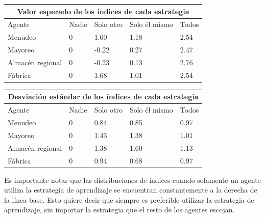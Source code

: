 \hspace{5pt}

\begin{tabular}{ |p{3cm}||p{1.7cm}|p{1.9cm}|p{2.3cm}|p{1.7cm}|  }
 \hline
 \multicolumn{5}{c}{Valor esperado de los \'indices de cada estrategia} \\
 \hline
 Agente & Nadie & Solo otro & Solo \'el mismo & Todos\\
 \hline
 Menudeo & 0 & 1.60 & 1.18 & 2.54\\
 Mayoreo & 0 & -0.22 & 0.27 & 2.47\\
 Almac\'en regional & 0 & -0.23 & 0.13 & 2.76\\
 F\'abrica & 0 & 1.68 & 1.01 & 2.54\\
 \hline
\end{tabular}


\hspace{5pt}

\begin{tabular}{ |p{3cm}||p{1.7cm}|p{1.9cm}|p{2.3cm}|p{1.7cm}|  }
 \hline
 \multicolumn{5}{c}{Desviaci\'on est\'andar de los \'indices de cada estrategia} \\
 \hline
 Agente & Nadie & Solo otro & Solo \'el mismo & Todos\\
 \hline
 Menudeo & 0 & 0.84 & 0.85 & 0.97\\
 Mayoreo & 0 & 1.43 & 1.38 & 1.01\\
 Almac\'en regional & 0 & 1.38 & 1.60 & 1.13\\
 F\'abrica & 0 & 0.94 & 0.68 & 0.97\\
 \hline
\end{tabular}

\hspace{25pt}

Es importante notar que las distribuciones de \'indices cuando solamente un agente utiliza la estrategia de aprendizaje se encuentran constantemente a la derecha de la l\'inea base. Esto quiere decir que siempre es preferible utilizar la estrategia de aprendizaje, sin importar la estrategia que el resto de los agentes escojan.\\

